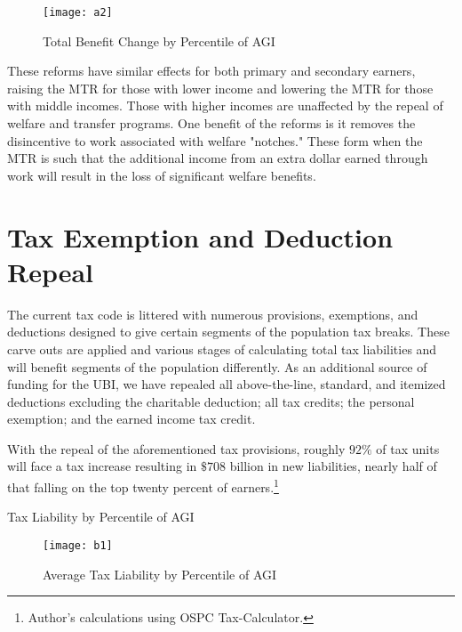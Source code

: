 \documentclass{article}
\begin{document}
\begin{figure}[H]
\centering
\caption{Total Benefit Change by Percentile of AGI}
\texttt{[image: a2]}
\end{figure}

These reforms have similar effects for both primary and secondary earners, raising the MTR for those with lower income and lowering the MTR for those with middle incomes. Those with higher incomes are unaffected by the repeal of welfare and transfer programs. One benefit of the reforms is it removes the disincentive to work associated with welfare "notches." These form when the MTR is such that the additional income from an extra dollar earned through work will result in the loss of significant welfare benefits.

\section{Tax Exemption and Deduction Repeal}
The current tax code is littered with numerous provisions, exemptions, and deductions designed to give certain segments of the population tax breaks. These carve outs are applied and various stages of calculating total tax liabilities and will benefit segments of the population differently. As an additional source of funding for the UBI, we have repealed all above-the-line, standard, and itemized deductions excluding the charitable deduction; all tax credits; the personal exemption; and the earned income tax credit.

With the repeal of the aforementioned tax provisions, roughly $92\%$ of tax units will face a tax increase resulting in $\$708$ billion in new liabilities, nearly half of that falling on the top twenty percent of earners.\footnote{Author’s calculations using OSPC Tax-Calculator.}

\begin{table}[H]
\caption{Tax Liability by Percentile of AGI}
\begin{center}
\begin{adjustbox}{max width=\textwidth}

\end{adjustbox}
\end{center}
\end{table}

\begin{figure}[H]
\centering
\caption{Average Tax Liability by Percentile of AGI}
\texttt{[image: b1]}
\end{figure}
\end{document}
